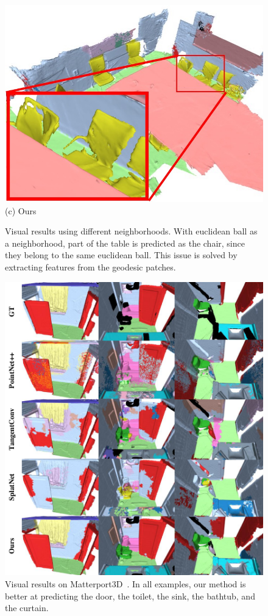 \begin{figure}[t]
\begin{minipage}{0.32\linewidth}
    \includegraphics[width=\linewidth]{texturenet/neighbors/ours.jpg}
    (c) Ours
    \end{minipage}
    \caption{Visual results using different neighborhoods. With euclidean ball as a neighborhood, part of the table is predicted as the chair, since they belong to the same euclidean ball. This issue is solved by extracting features from the geodesic patches.}
    \label{fig:texturenet-neighbor}
\end{figure}

\begin{figure}[t]
    \centering
    \includegraphics[width=0.75\linewidth]{texturenet/result/matterport.pdf}
    \caption{Visual results on Matterport3D~\cite{chang2017matterport3d}. In all examples, our method is better at predicting the door, the toilet, the sink, the bathtub, and the curtain.}
    \label{fig:texturenet-result-Matterport3D}
\end{figure}

